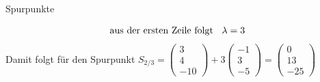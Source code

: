 \begin{bsp}{Spurpunkte}{}
\begin{enumerate}
\[\begin{aligned}
    \text{aus der ersten Zeile folgt \hspace{0.2cm}} \lambda = 3  
        \end{aligned}\]
                Damit folgt für den Spurpunkt \(S_{2/3} = \begin{pmatrix}
            3\\4\\-10
        \end{pmatrix} +3 \begin{pmatrix}
            -1\\3\\-5
        \end{pmatrix} = \begin{pmatrix}
           0\\13\\-25
        \end{pmatrix}\)
    \end{enumerate}
\end{bsp}
